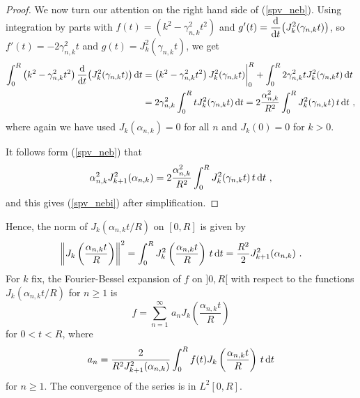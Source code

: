 \begin{proof}
We now turn our attention on the right hand side of (\ref{spv_neb}).
Using integration by parts with
$\displaystyle f(t) = \left(k^2 - \gamma_{n,k}^2 t^2\right)$
and $\displaystyle g'(t) = \dfdx{\left( J_k^2(\gamma_{n,k}t)\right)}{t}$,
so $f'(t) = - 2\gamma_{n,k}^2 t$ and
$\displaystyle g(t) = J_k^2(\gamma_{n,k}t)$, we get
\begin{align*}
\int_0^R \left(k^2 - \gamma_{n,k}^2 t^2\right)
\dfdx{\left( J_k^2(\gamma_{n,k}t)\right)}{t} \dx{t} 
&= \left(k^2 - \gamma_{n,k}^2 t^2\right) J_k^2(\gamma_{n,k}t)\bigg|_0^R
+ \int_0^R 2\gamma_{n,k}^2 t J_k^2(\gamma_{n,k}t) \dx{t} \\
&= 2\gamma_{n,k}^2 \int_0^R t J_k^2(\gamma_{n,k}t) \dx{t}
= 2\frac{\alpha_{n,k}^2}{R^2 } \int_0^R J_k^2(\gamma_{n,k}t)\, t \dx{t} \ ,
\end{align*}
where again we have used $J_k(\alpha_{n,k})=0$ for all $n$ and
$J_k(0) = 0$ for $k>0$.

It follows form (\ref{spv_neb}) that
\[
\alpha_{n,k}^2 J_{k+1}^2(\alpha_{n,k}) = 
2\frac{\alpha_{n,k}^2}{R^2 } \int_0^R J_k^2(\gamma_{n,k}t)\, t \dx{t} \ ,
\]
and this gives (\ref{spv_nebi}) after simplification.
\end{proof}

Hence, the norm of
$\displaystyle J_k\left(\alpha_{n,k} t / R\right)$ on $[0,R]$ is
given by
\[
\left\| J_k\left(\frac{\alpha_{n,k} t}{R}\right) \right\|^2
= \int_0^R J_k^2\left(\frac{\alpha_{n,k} t}{R}\right) \, t \dx{t} =
\frac{R^2}{2} J_{k+1}^2 (\alpha_{n,k}) \ .
\]
For $k$ fix, the Fourier-Bessel expansion of $f$ on $]0,R[$ with
respect to the functions
$\displaystyle J_k\left(\alpha_{n,k} t/R\right)$ for $n \geq 1$ is
\[
f = \sum_{n=1}^{\infty}\, a_{n}
J_k\left(\frac{\alpha_{n,k} t}{R}\right)
\]
for $0 < t < R$, where
\[
a_n = \frac{2}{R^2 J_{k+1}^2(\alpha_{n,k})} \int_0^R f(t)
J_k\left(\frac{\alpha_{n,k} t}{R}\right) \, t \dx{t}
\]
for $n \geq 1$.  The convergence of the series is in $\displaystyle L^2[0,R]$.

